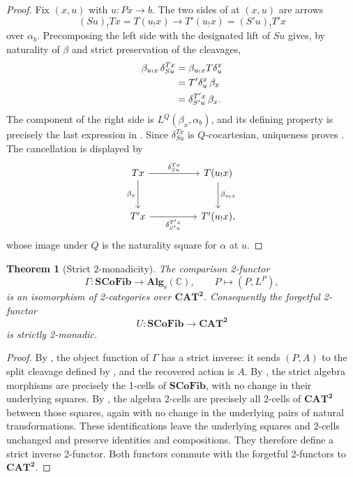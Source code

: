 \documentclass[11pt]{article}
\theoremstyle{plain}
\newtheorem{theorem}{Theorem}[section]
\theoremstyle{definition}
\theoremstyle{remark}
\newcommand{\CAT}{\mathbf{CAT}}
\newcommand{\SCoFib}{\mathbf{SCoFib}}
\newcommand{\Alg}{\mathbf{Alg}_{\mathrm{s}}}
\newcommand{\C}{\mathbb{C}}
\numberwithin{equation}{section}
\begin{document}
\begin{proof}
Fix $(x,u)$ with $u\colon Px\to b$.  The two sides of
 at $(x,u)$ are arrows
\begin{equation*}
(Su)_{!}Tx=T(u_{!}x)
  \longrightarrow
  T'(u_{!}x)=(S'u)_{!}T'x
\end{equation*}
over $\alpha_b$.  Precomposing the left side with the designated
lift of $Su$ gives, by naturality of $\beta$ and strict preservation
of the cleavages,
\begin{align}
  \beta_{u_{!}x}\,\delta^{Tx}_{Su}
  &=\beta_{u_{!}x}T\delta^{x}_{u}\notag\\
  &=T'\delta^{x}_{u}\,\beta_x\notag\\
  &=\delta^{T'x}_{S'u}\,\beta_x.
  \label{eq:2cell-precompose}
\end{align}
The component of the right side is
$L^{Q}(\beta_x,\alpha_b)$, and its defining property is precisely
the last expression in .  Since
$\delta^{Tx}_{Su}$ is $Q$-cocartesian, uniqueness proves
.
The cancellation is displayed by
\begin{equation*}
\begin{tikzcd}[column sep=huge,row sep=large]
Tx \arrow[r,"\delta^{Tx}_{Su}"] \arrow[d,"\beta_x"']
& T(u_!x) \arrow[d,"\beta_{u_!x}"] \\
T'x \arrow[r,"\delta^{T'x}_{S'u}"']
& T'(u_!x),
\end{tikzcd}
\end{equation*}
whose image under $Q$ is the naturality square for $\alpha$ at $u$.
\end{proof}

\begin{theorem}[Strict 2-monadicity]\label{thm:main}
The comparison 2-functor
\begin{equation}
\Gamma\colon\SCoFib\longrightarrow\Alg(\C),
  \qquad
  P\longmapsto(P,L^{P}),
  \label{eq:comparison}
\end{equation}
is an isomorphism of 2-categories over $\CAT^{\mathbf 2}$.
Consequently the forgetful 2-functor
\begin{equation*}
U\colon\SCoFib\longrightarrow\CAT^{\mathbf 2}
\end{equation*}
is strictly 2-monadic.
\end{theorem}

\begin{proof}
By , the object function of $\Gamma$ has a
strict inverse: it sends $(P,A)$ to the split cleavage defined by
, and the recovered action is $A$.
By , the strict algebra morphisms are precisely
the 1-cells of $\SCoFib$, with no change in their underlying squares.
By , the algebra 2-cells are precisely all
2-cells of $\CAT^{\mathbf 2}$ between those squares, again with no
change in the underlying pairs of natural transformations.  These
identifications leave the underlying squares and 2-cells unchanged and
preserve identities and compositions.  They therefore define a strict
inverse 2-functor.  Both functors commute with the forgetful
2-functors to $\CAT^{\mathbf 2}$.
\end{proof}
\end{document}
